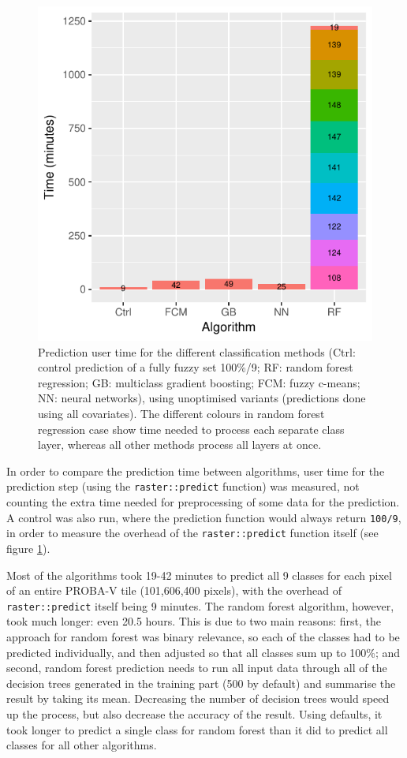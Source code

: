 \documentclass[a4paper,10pt]{book}
\begin{document}
\begin{figure}
  \centering
  \includegraphics[width=\textwidth]{../plot/timing}
  \caption{Prediction user time for the different classification methods (Ctrl: control prediction of a fully fuzzy set 100\%/9; RF: random forest regression; GB: multiclass gradient boosting; FCM: fuzzy c-means; NN: neural networks), using unoptimised variants (predictions done using all covariates). The different colours in random forest regression case show time needed to process each separate class layer, whereas all other methods process all layers at once.}
  \label{fig-timing}
\end{figure}

In order to compare the prediction time between algorithms, user time for the prediction step (using the \texttt{raster::predict} function) was measured, not counting the extra time needed for preprocessing of some data for the prediction. A control was also run, where the prediction function would always return \texttt{100/9}, in order to measure the overhead of the \texttt{raster::predict} function itself (see figure \ref{fig-timing}).

Most of the algorithms took 19-42 minutes to predict all 9 classes for each pixel of an entire PROBA-V tile (101,606,400 pixels), with the overhead of \texttt{raster::predict} itself being 9 minutes. The random forest algorithm, however, took much longer: even 20.5 hours. This is due to two main reasons: first, the approach for random forest was binary relevance, so each of the classes had to be predicted individually, and then adjusted so that all classes sum up to 100\%; and second, random forest prediction needs to run all input data through all of the decision trees generated in the training part (500 by default) and summarise the result by taking its mean. Decreasing the number of decision trees would speed up the process, but also decrease the accuracy of the result. Using defaults, it took longer to predict a single class for random forest than it did to predict all classes for all other algorithms.
\end{document}
